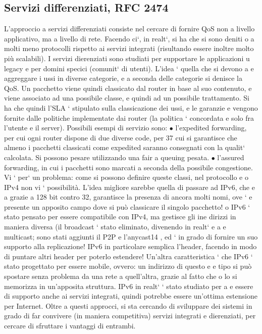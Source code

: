 \documentclass[a4paper,12pt]{article}
\begin{document}
\subsection{Servizi differenziati, RFC 2474}
L'approccio a servizi differenziati consiste nel cercare di fornire QoS non a livello
applicativo, ma a livello di rete. Facendo ci`, in realt`, si ha che si sono deniti
o
a
molti meno protocolli rispetto ai servizi integrati (risultando essere inoltre molto
più scalabili). I servizi dierenziati sono studiati per supportare le applicazioni
u
legacy e per domini specici (comunit` di utenti). L'idea ` quella che si devono
a
e
aggreggare i ussi in diverse categorie, e a seconda delle categorie si denisce la
QoS. Un pacchetto viene quindi classicato dal router in base al suo contenuto,
e viene associato ad una possibile classe, e quindi ad un possibile trattamento.
Si ha che quindi l'SLA ` stipulato sulla classicazione dei ussi, e le garanzie
e
vengono fornite dalle politiche implementate dai router (la politica ` concordata
e
solo fra l'utente e il server).
Possibili esempi di servizio sono:
$\bullet$ l'expedited forwarding, per cui ogni router dispone di due diverse code, per
37
cui si garantisce che almeno i pacchetti classicati come expedited saranno
consegnati con la qualit` calcolata. Si possono pesare utilizzando una fair
a
queuing pesata.
$\bullet$ l'assured forwarding, in cui i pacchetti sono marcati a seconda della possibile congestione.
Vi ` per` un problema: come si possono definire queste classi, nel protocollo
e
o
IPv4 non vi ` possibilità. L'idea migliore sarebbe quella di passare ad IPv6, che
e
a
grazie a 128 bit contro 32, garantisce la presenza di ancora molti nomi, ove `
e
presente un apposito campo dove si può classicare il singolo pacchetto!
o
IPv6 ` stato pensato per essere compatibile con IPv4, ma gestisce gli ine
dirizzi in maniera diversa (il broadcast ` stato eliminato, divenendo in realt`
e
a
e
multicast; sono stati aggiunti il P2P e l'anycast14 , ed ` in grado di fornire un
suo supporto alla replicazione! IPv6 in particolare semplica l'header, facendo
in modo di puntare altri header per poterlo estendere! Un'altra caratteristica
` che IPv6 ` stato progettato per essere mobile, ovvero: un indirizzo di questo
e
e
tipo si può spostare senza problema da una rete a quell'altra, grazie al fatto che
o
lo si memorizza in un'apposita struttura. IPv6 in realt` ` stato studiato per
a e
essere di supporto anche ai servizi integrati, quindi potrebbe essere un'ottima
estensione per Internet.
Oltre a questi approcci, si sta cercando di sviluppare dei sistemi in grado
di far convivere (in maniera competitiva) servizi integrati e dierenziati, per
cercare di sfruttare i vantaggi di entrambi.
\end{document}

